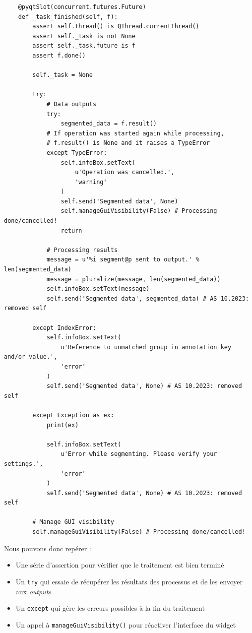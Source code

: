 \documentclass{article}
\begin{document}
\begin{verbatim}
    @pyqtSlot(concurrent.futures.Future)
    def _task_finished(self, f):
        assert self.thread() is QThread.currentThread()
        assert self._task is not None
        assert self._task.future is f
        assert f.done()

        self._task = None

        try:
            # Data outputs
            try:
                segmented_data = f.result()
            # If operation was started again while processing,
            # f.result() is None and it raises a TypeError
            except TypeError:
                self.infoBox.setText(
                    u'Operation was cancelled.',
                    'warning'
                )
                self.send('Segmented data', None)
                self.manageGuiVisibility(False) # Processing done/cancelled!
                return

            # Processing results
            message = u'%i segment@p sent to output.' % len(segmented_data)
            message = pluralize(message, len(segmented_data))
            self.infoBox.setText(message)
            self.send('Segmented data', segmented_data) # AS 10.2023: removed self

        except IndexError:
            self.infoBox.setText(
                u'Reference to unmatched group in annotation key and/or value.',
                'error'
            )
            self.send('Segmented data', None) # AS 10.2023: removed self

        except Exception as ex:
            print(ex)
        
            self.infoBox.setText(
                u'Error while segmenting. Please verify your settings.',
                'error'
            )
            self.send('Segmented data', None) # AS 10.2023: removed self

        # Manage GUI visibility
        self.manageGuiVisibility(False) # Processing done/cancelled!
\end{verbatim}

Nous pouvons donc repérer :
\begin{itemize}
    \item Une série d'assertion pour vérifier que le traitement est bien terminé
    \item Un \texttt{try} qui essaie de récupérer les résultats des processus et de les envoyer aux \textit{outputs}
    \item Un \texttt{except} qui gère les erreurs possibles à la fin du traitement
    \item Un appel à \texttt{manageGuiVisibility()} pour réactiver l'interface du widget
\end{itemize}
\end{document}
